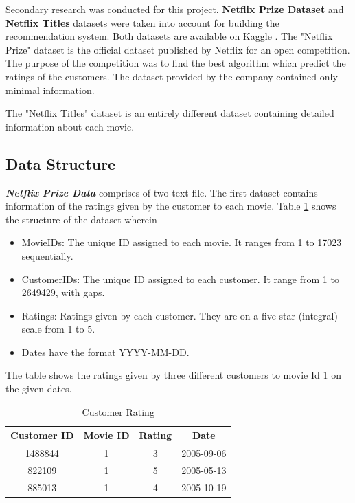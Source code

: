 \documentclass[a4paper,10pt]{article}
\begin{document}
Secondary research was conducted for this project. \textbf{Netflix Prize Dataset} and \textbf{Netflix Titles} datasets were taken into account for building the recommendation system. Both datasets are available on Kaggle \cite{kaggle}. The "Netflix Prize" dataset is the official dataset published by Netflix for an open competition. The purpose of the competition was to find the best algorithm which predict the ratings of the customers. The dataset provided by the company contained only minimal information. 

The "Netflix Titles" dataset is an entirely different dataset containing detailed information about each movie.

\subsection{Data Structure}

\textbf{\textit{Netflix Prize Data}} comprises of two text file. The first dataset contains information of the ratings given by the customer to each movie. Table \ref{Data_1} shows the structure of the dataset wherein 

\begin{itemize}
  \item MovieIDs: The unique ID assigned to each movie. It ranges from 1 to 17023 sequentially.
  \item CustomerIDs: The unique ID assigned to each customer. It range from 1 to 2649429, with gaps.
  \item Ratings: Ratings given by each customer. They are on a five-star (integral) scale from 1 to 5.
  \item Dates have the format YYYY-MM-DD.
\end{itemize}
The table shows the ratings given by three different customers to movie Id 1 on the given dates. 



\begin{table}[H]
    \center 
    
    \begin{tabular}{|c|c|c|c|} \hline 
         Customer ID&  Movie ID&  Rating& Date\\ \hline 
         1488844&  1&  3& 2005-09-06
\\ \hline 
         822109&  1&  5& 2005-05-13
\\ \hline 
         885013&  1&  4& 2005-10-19
\\ \hline
    \end{tabular}
    \caption{Customer Rating}   
    \label{Data_1} 
\end{table}
\end{document}
